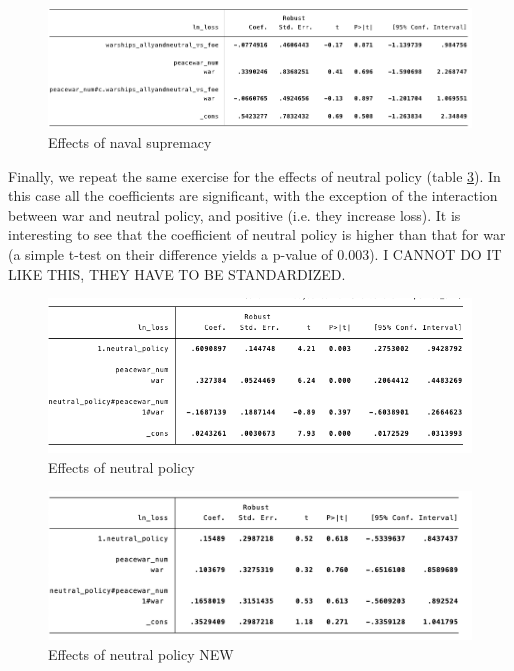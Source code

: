 \documentclass[12pt,a4paper,notitlepage,english]{article}
\begin{document}
\begin{figure}
\centering
\caption{Effects of naval supremacy}
\label{effects_naval_supremacy}
\includegraphics[scale=.6]{reg2}
\end{figure}
Finally, we repeat the same exercise for the effects of neutral policy (table \ref{effects_neutral_policy}). In this case all the coefficients are significant, with the exception of the interaction between war and neutral policy, and positive (i.e. they increase loss). It is interesting to see that the coefficient of neutral policy is higher than that for war (a simple t-test on their difference yields a p-value of 0.003). I CANNOT DO IT LIKE THIS, THEY HAVE TO BE STANDARDIZED. \\
\begin{figure}
\centering
\caption{Effects of neutral policy}
\label{effects_neutral_policy}
\includegraphics[scale=.65]{reg3}
\end{figure}


\begin{figure}
	\centering
	\caption{Effects of neutral policy NEW}
	\label{effects_neutral_policy}
	\includegraphics[scale=.65]{reg_3_Neutral_Policy_NEW}
\end{figure}
\end{document}
